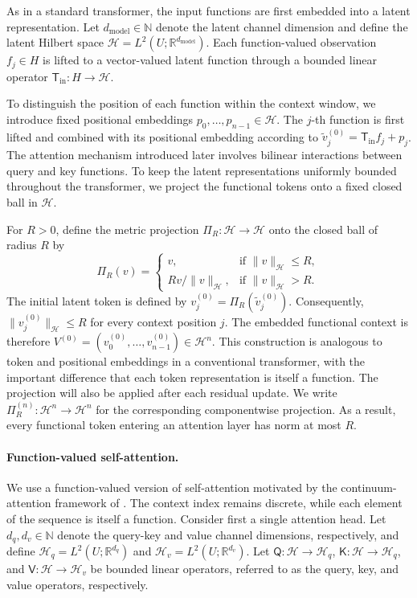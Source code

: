 As in a standard transformer, the input functions are first embedded into a latent representation. Let \(d_{\mathrm{model}}\in\mathbb N\) denote the latent channel dimension and define the latent Hilbert space \(\mathcal H=L^2(U;\mathbb R^{d_{\mathrm{model}}})\). Each function-valued observation \(f_j\in H\) is lifted to a vector-valued latent function through a bounded linear operator \(\mathsf T_{\mathrm{in}}:H\to\mathcal H\).

To distinguish the position of each function within the context window, we introduce fixed positional embeddings \(p_0,\ldots,p_{n-1}\in\mathcal H\). The \(j\)-th function is first lifted and combined with its positional embedding according to \(\widetilde v_j^{(0)}=\mathsf T_{\mathrm{in}}f_j+p_j\).
The attention mechanism introduced later involves bilinear interactions between query and key functions. To keep the latent representations uniformly bounded throughout the transformer, we project the functional tokens onto a fixed closed ball in \(\mathcal H\).

For \(R>0\), define the metric projection \(\Pi_R:\mathcal H\to\mathcal H\) onto the closed ball of radius \(R\) by
\[
\Pi_R(v)=
\begin{cases}
v, & \text{if } \|v\|_{\mathcal H}\leqslant R,\\[4pt]
{Rv/}{\|v\|_{\mathcal H}}, & \text{if } \|v\|_{\mathcal H}>R.
\end{cases}
\]
The initial latent token is defined by \(v_j^{(0)}=\Pi_R(\widetilde v_j^{(0)})\). Consequently, \(\|v_j^{(0)}\|_{\mathcal H}\leqslant R\) for every context position \(j\).
The embedded functional context is therefore \(V^{(0)}=(v_0^{(0)},\ldots,v_{n-1}^{(0)})\in\mathcal H^n\). This construction is analogous to token and positional embeddings in a conventional transformer, with the important difference that each token representation is itself a function.
The projection will also be applied after each residual update. We write \(\Pi_R^{(n)}:\mathcal H^n\to\mathcal H^n\) for the corresponding componentwise projection. As a result, every functional token entering an attention layer has norm at most \(R\).

\paragraph{Function-valued self-attention.}

We use a function-valued version of self-attention motivated by the continuum-attention framework of \cite{CalvelloEtAl2025}. The context index remains discrete, while each element of the sequence is itself a function.
Consider first a single attention head. Let \(d_q,d_v\in\mathbb N\) denote the query-key and value channel dimensions, respectively, and define \(\mathcal H_q=L^2(U;\mathbb R^{d_q})\) and \(\mathcal H_v=L^2(U;\mathbb R^{d_v})\). Let \(\mathsf Q:\mathcal H\to\mathcal H_q\), \(\mathsf K:\mathcal H\to\mathcal H_q\), and \(\mathsf V:\mathcal H\to\mathcal H_v\) be bounded linear operators, referred to as the query, key, and value operators, respectively.

